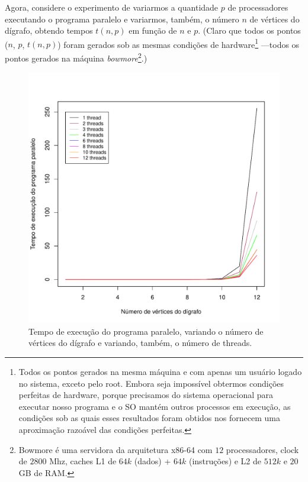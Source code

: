 \documentclass[a4paper,article,10pt]{article}
\begin{document}
    Agora, considere o experimento de variarmos a quantidade $p$ de
    processadores executando o programa paralelo e variarmos, também, o número
    $n$ de vértices do dígrafo, obtendo tempos $t(n, p)$ em função de $n$ e $p$.
    (Claro que todos os pontos ($n$, $p$, $t(n, p)$) foram gerados sob as mesmas
    condições de hardware\footnote{Todos os pontos gerados na mesma máquina e
      com apenas um usuário logado no sistema, exceto pelo root.
      Embora seja impossível obtermos condições perfeitas de hardware, porque
      precisamos do sistema operacional para executar nosso programa e o SO
      mantém outros processos em execução, as condições sob as quais esses
      resultados foram obtidos nos fornecem uma aproximação razoável das
      condições perfeitas.} ---todos os pontos gerados na máquina
    \emph{bowmore}\footnote{Bowmore é uma servidora da arquitetura x86-64 com
      $12$ processadores, clock de $2800$ Mhz, caches L1 de $64k$ (dados) +
      $64k$ (instruções) e L2 de $512k$ e $20$ GB de RAM.}.)
    
    \begin{figure}
      \centering
      \includegraphics[scale=0.8]{paralelo.pdf}
      \caption{Tempo de execução do programa paralelo, variando o número de
        vértices do dígrafo e variando, também, o número de threads.}
      \label{fig-paralelo}
    \end{figure}
\end{document}

